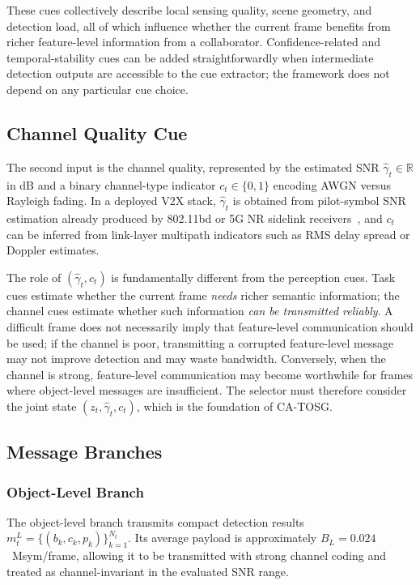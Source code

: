 \documentclass[journal]{IEEEtran}
\newcommand{\method}{CA-TOSG}
\begin{document}
These cues collectively describe local sensing quality, scene geometry, and detection load, all of which influence whether the current frame benefits from richer feature-level information from a collaborator. Confidence-related and temporal-stability cues can be added straightforwardly when intermediate detection outputs are accessible to the cue extractor; the framework does not depend on any particular cue choice.

\subsection{Channel Quality Cue}

The second input is the channel quality, represented by the estimated SNR $\hat\gamma_t \in \mathbb{R}$ in dB and a binary channel-type indicator $c_t \in \{0,1\}$ encoding AWGN versus Rayleigh fading. In a deployed V2X stack, $\hat\gamma_t$ is obtained from pilot-symbol SNR estimation already produced by 802.11bd or 5G NR sidelink receivers~\cite{ieee80211bd}, and $c_t$ can be inferred from link-layer multipath indicators such as RMS delay spread or Doppler estimates.

The role of $(\hat\gamma_t,c_t)$ is fundamentally different from the perception cues. Task cues estimate whether the current frame \emph{needs} richer semantic information; the channel cues estimate whether such information \emph{can be transmitted reliably}. A difficult frame does not necessarily imply that feature-level communication should be used; if the channel is poor, transmitting a corrupted feature-level message may not improve detection and may waste bandwidth. Conversely, when the channel is strong, feature-level communication may become worthwhile for frames where object-level messages are insufficient. The selector must therefore consider the joint state $(z_t,\hat\gamma_t,c_t)$, which is the foundation of \method{}.

\subsection{Message Branches}

\subsubsection{Object-Level Branch}
The object-level branch transmits compact detection results $m_t^L = \{(b_k,c_k,p_k)\}_{k=1}^{N_t}$. Its average payload is approximately $B_L = 0.024$~Msym/frame, allowing it to be transmitted with strong channel coding and treated as channel-invariant in the evaluated SNR range.
\end{document}
